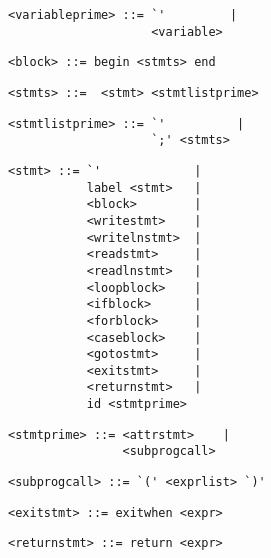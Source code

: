 \begin{footnotesize}
\begin{lstlisting}[frame=single, label={variableprime}, language=pie]
<variableprime> ::= `'         |
                    <variable>
\end{lstlisting}

\begin{lstlisting}[frame=single, label={block}, language=pie]
<block> ::= begin <stmts> end
\end{lstlisting}

\begin{lstlisting}[frame=single, label={stmts}, language=pie]
<stmts> ::=  <stmt> <stmtlistprime>
\end{lstlisting}

\begin{lstlisting}[frame=single, label={stmtlistprime}, language=pie]
<stmtlistprime> ::= `'          |
                    `;' <stmts>
\end{lstlisting}

\begin{lstlisting}[frame=single, label={stmt}, language=pie]
<stmt> ::= `'             |
           label <stmt>   |
           <block>        |
           <writestmt>    |
           <writelnstmt>  |
           <readstmt>     |
           <readlnstmt>   |
           <loopblock>    |
           <ifblock>      |
           <forblock>     |
           <caseblock>    |
           <gotostmt>     |
           <exitstmt>     |
           <returnstmt>   |
           id <stmtprime>
\end{lstlisting}

\begin{lstlisting}[frame=single, label={stmtprime}, language=pie]
<stmtprime> ::= <attrstmt>    |
                <subprogcall>
\end{lstlisting}

\begin{lstlisting}[frame=single, label={subprogcall}, language=pie]
<subprogcall> ::= `(' <exprlist> `)'
\end{lstlisting}

\begin{lstlisting}[frame=single, label={exitstmt}, language=pie]
<exitstmt> ::= exitwhen <expr>
\end{lstlisting}

\begin{lstlisting}[frame=single, label={returnstmt}, language=pie]
<returnstmt> ::= return <expr>
\end{lstlisting}


\end{footnotesize}
